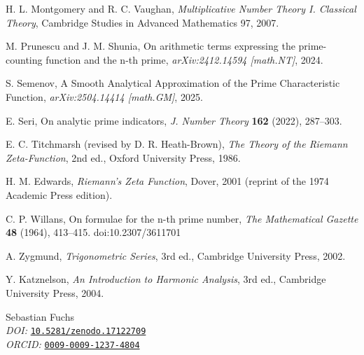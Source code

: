 \documentclass[11pt,a4paper]{amsart}
\theoremstyle{plain}
\theoremstyle{definition}
\theoremstyle{remark}
\begin{document}
\begin{thebibliography}{99}
H. L. Montgomery and R. C. Vaughan, \emph{Multiplicative Number Theory I. Classical Theory}, Cambridge Studies in Advanced Mathematics 97, 2007.

M. Prunescu and J. M. Shunia, On arithmetic terms expressing the prime-counting function and the n-th prime, \emph{arXiv:2412.14594 [math.NT]}, 2024.

S. Semenov, A Smooth Analytical Approximation of the Prime Characteristic Function, \emph{arXiv:2504.14414 [math.GM]}, 2025.

E. Seri, On analytic prime indicators, \emph{J. Number Theory} \textbf{162} (2022), 287--303.

E. C. Titchmarsh (revised by D. R. Heath-Brown), \emph{The Theory of the Riemann Zeta-Function}, 2nd ed., Oxford University Press, 1986.

H. M. Edwards, \emph{Riemann's Zeta Function}, Dover, 2001 (reprint of the 1974 Academic Press edition).

C. P. Willans, On formulae for the n-th prime number,
\emph{The Mathematical Gazette} \textbf{48} (1964), 413--415.
doi:10.2307/3611701

A. Zygmund, \emph{Trigonometric Series}, 3rd ed., Cambridge University Press, 2002.

Y. Katznelson, \emph{An Introduction to Harmonic Analysis}, 3rd ed., Cambridge University Press, 2004.


\end{thebibliography}

\vfill
\par\noindent
\small
Sebastian Fuchs \\[1ex]
\textit{DOI:} \texttt{\href{https://doi.org/10.5281/zenodo.17122709}{10.5281/zenodo.17122709}} \\ 
\textit{ORCID:} \texttt{\href{https://orcid.org/0009-0009-1237-4804}{0009-0009-1237-4804}} \\
\end{document}
